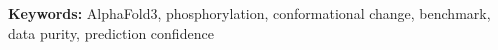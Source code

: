 \documentclass[11pt]{article}
\begin{document}
\noindent\textbf{Keywords:} AlphaFold3, phosphorylation,
conformational change, benchmark, data purity, prediction confidence







\end{document}
